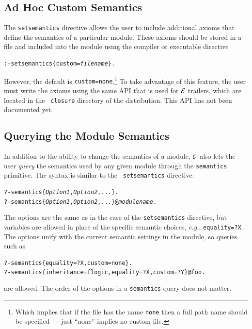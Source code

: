 \documentclass[11pt]{article}
\newcommand{\ERGO}{\mbox{\ensuremath{\cal{E}}\smaller{{\sc{RGO}}}}\xspace}
\newcommand{\FLSYSTEM}{\ERGO}
\begin{document}
\subsection{Ad Hoc Custom Semantics}\label{sec-ad-hoc-semantics}

The {\tt setsemantics} directive allows the user to include additional axioms
that define the semantics of a particular module. These axioms should be
stored in a file and included into the module using the compiler or
executable directive
\begin{alltt}
   :- setsemantics\{custom=\emph{filename}\}.  
\end{alltt}
However, the default is  {\tt custom=none}.\footnote{
  Which implies that if the file has the name {\tt none} then a full path
  name should be specified --- just ``none'' implies no custom file.
}
To take advantage of this feature, the user must write the axioms using the
same API that is used for \FLSYSTEM trailers, which are located in the {\tt
  closure} directory of the distribution. This API has not been documented
yet.

\subsection{Querying the Module Semantics}\label{sec-query-semantics}

In addition to the ability to change the semantics of a module, \FLSYSTEM also
lets the user \emph{query} the semantics used by any given module through
the {\tt semantics} primitive. The syntax is similar to the {\tt
  setsemantics} directive:
\begin{alltt}
   ?- semantics\{{\em Option1}, {\em Option2}, ...\}. 
   ?- semantics\{{\em Option1}, {\em Option2}, ...\}@\emph{modulename}.
\end{alltt}
The options are the same as in the case of the {\tt setsemantics}
directive, but variables are allowed in place of the specific semantic
choices, {\it e.g.}, {\tt equality=?X}. The options unify with the current
semantic settings in the module, so queries such as 
\begin{alltt}
   ?- semantics\{equality=?X, custom=none\}.
   ?- semantics\{inheritance=flogic, equality=?X, custom=?Y\}@foo.
\end{alltt}
are allowed. The order of the options in a {\tt semantics}-query does not
matter.
\end{document}
